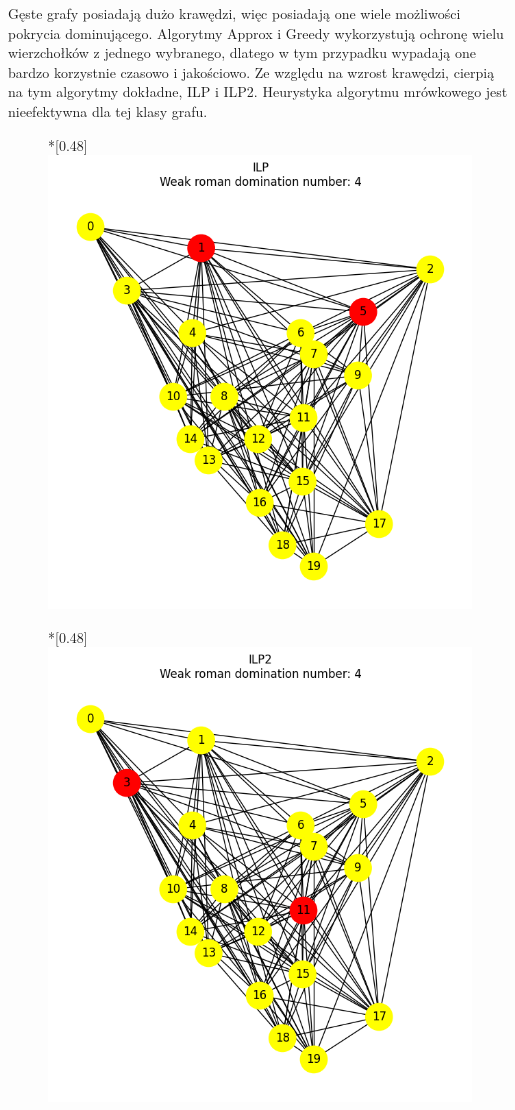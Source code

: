     Gęste grafy posiadają dużo krawędzi, więc posiadają one wiele możliwości pokrycia dominującego. Algorytmy Approx i Greedy wykorzystują ochronę wielu wierzchołków z jednego wybranego, dlatego w tym przypadku wypadają one bardzo korzystnie czasowo i jakościowo. Ze względu na wzrost krawędzi, cierpią na tym algorytmy dokładne, ILP i ILP2. Heurystyka algorytmu mrówkowego jest nieefektywna dla tej klasy grafu.

    \begin{figure}[H]
        \centering
        \begin{subcaptionbox}*{}[0.48\linewidth]
            {\includegraphics[width=0.75\linewidth]{assets/plots/ILP/ErdosRenyi_dense_n20_i2_results.png}}
        \end{subcaptionbox}
        \hfill
        \begin{subcaptionbox}*{}[0.48\linewidth]
            {\includegraphics[width=0.75\linewidth]{assets/plots/ILP2/ErdosRenyi_dense_n20_i2_results.png}}

\end{subcaptionbox}
\end{figure}
